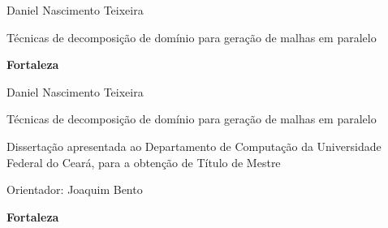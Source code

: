 \pagestyle{empty}

\begin{titlepage}


\begin{center}
{\LARGE Daniel Nascimento Teixeira}
\par
\vspace{200pt}
{\Huge Técnicas de decomposição de domínio para geração de malhas em paralelo}
\par
\vfill
\textbf{{\large Fortaleza}\\
{\large \the\year}}
\end{center}
\end{titlepage}

\cleardoublepage

\pagestyle{fancy}



\thispagestyle{empty}

\begin{center}
{\LARGE Daniel Nascimento Teixeira}
\par
\vspace{200pt}
{\Huge Técnicas de decomposição de domínio para geração de malhas em paralelo}
\end{center}
\par
\vspace{90pt}
\hspace*{175pt}\parbox{7.6cm}{{\large Dissertação apresentada ao Departamento de Computação da Universidade Federal do Ceará, para a obtenção de Título de Mestre}}

\par
\vspace{1em}
\hspace*{175pt}\parbox{7.6cm}{{\large Orientador: Joaquim Bento}}

\par
\vfill
\begin{center}
\textbf{{\large Fortaleza}\\
{\large \the\year}}
\end{center}

